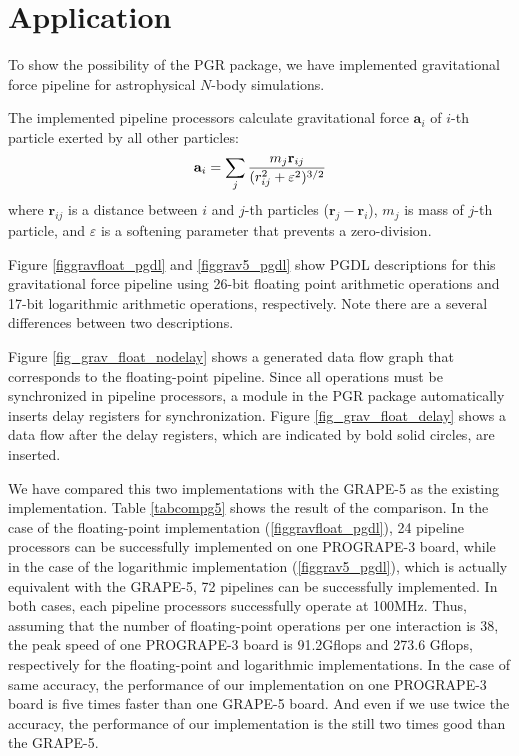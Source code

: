 \documentclass[times, 10pt,twocolumn]{article}
\begin{document}
\section{Application}
To show the possibility of the PGR package, we have implemented gravitational
force pipeline for astrophysical $N$-body simulations.

The implemented pipeline processors calculate gravitational force 
$\mathbf{a}_i$ of $i$-th particle exerted by all other particles:
\begin{equation}
\mathbf{ a}_i = \sum_j {m_j \mathbf{ r}_{ij} \over (r_{ij}^2 + \varepsilon^2)^{3/2}}
\end{equation}
where $\mathbf{r}_{ij}$ is a distance between $i$ and $j$-th particles
($\mathbf{r}_j - \mathbf{r}_i $), 
$m_{j}$ is mass of $j$-th particle, and $\varepsilon$ is a softening parameter
that prevents a zero-division.

Figure \ref{figgravfloat_pgdl} and \ref{figgrav5_pgdl}
show PGDL descriptions for this gravitational force pipeline
using 26-bit floating point arithmetic operations and
17-bit logarithmic arithmetic operations, respectively.
Note there are a several differences between two descriptions.

Figure \ref{fig_grav_float_nodelay} shows a generated 
data flow graph that corresponds to the floating-point pipeline.
Since all operations must be synchronized in pipeline processors, 
a module in the PGR package automatically inserts
delay registers for synchronization.
Figure \ref{fig_grav_float_delay} shows a data flow
after the delay registers, which are indicated by bold solid circles, are inserted.

We have compared this two implementations with 
the GRAPE-5 as the existing implementation.
Table \ref{tabcompg5} shows the result of the comparison.
In the case of the floating-point implementation (\ref{figgravfloat_pgdl}),
24 pipeline processors can be successfully implemented on one PROGRAPE-3 board, 
while in the case of the logarithmic implementation (\ref{figgrav5_pgdl}),
which is actually equivalent with the GRAPE-5, 
72 pipelines can be successfully implemented.
In both cases, each pipeline processors successfully operate at 100MHz.
Thus, assuming that the number of floating-point operations per one interaction
is 38, the peak speed of one PROGRAPE-3 board is 91.2Gflops
and 273.6 Gflops, respectively for the floating-point and logarithmic implementations.
In the case of same accuracy, the performance of our implementation
on one PROGRAPE-3 board is five times faster than one GRAPE-5 board.
And even if we use twice the accuracy, the performance of our implementation
is the still two times good than the GRAPE-5.
\end{document}
